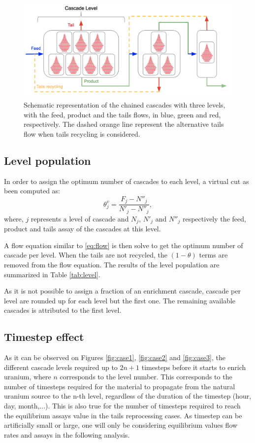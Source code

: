 \begin{figure}[ht] %
    \centering
    \includegraphics[scale=0.45]{flow}
    \caption{Schematic representation of the chained cascades with three levels,
    with the feed, product and the tails flows, in blue, green and red,
    respectively. The dashed orange line represent the alternative tails flow when
    tails recycling is considered.}
    \label{fig:cascade_level}
\end{figure}


\subsection{Level population}
In order to assign the optimum number of cascades to each level, a virtual cut as
been computed as:
\begin{equation}
    \theta^{v}_{j} = \frac{F_{j}-N''_{j}}{N'_{j}-N''_{j}},
\end{equation}
where, $j$ represents a level of cascade and $N_{j}$, $N'_{j}$ and $N''_{j}$
respectively the feed, product and tails assay of the cascades at this level.

A flow equation similar to \eqref{eq:flow} is then solve to get the optimum
number of cascade per level. When the tails are not recycled, the $(1-\theta)$
terms are removed from the flow equation.  The results of the level population
are summarized in Table \ref{tab:level}.

As it is not possible to assign a fraction of an enrichment cascade, cascade per
level are rounded up for each level but the first one. The remaining available
cascades is attributed to the first level.


\subsection{Timestep effect}

As it can be observed on Figures \ref{fig:case1}, \ref{fig:case2} and
\ref{fig:case3}, the different cascade levels required up to $2n+1$ timesteps
before it starts to enrich uranium, where $n$ corresponds to the level number.
This corresponds to the number of timesteps required for the material to
propagate from the natural uranium source to the n-th level, regardless of the
duration of the timestep (hour, day, month,...). This is also true for the
number of timesteps required to reach the equilibrium assays value in the tails
reprocessing cases.  As timestep can be artificially small or large, one will
only be considering equilibrium values flow rates and assays in the following
analysis.
